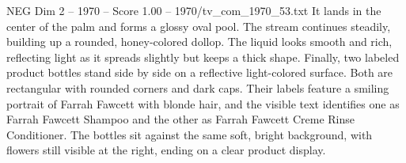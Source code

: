 \begin{textsample}{NEG Dim 2 – 1970 – Score 1.00 – 1970/tv\_com\_1970\_53.txt}
It lands in the center of the palm and forms a glossy oval pool.
The stream continues steadily, building up a rounded, honey-colored dollop.
The liquid looks smooth and rich, reflecting light as it spreads slightly but keeps a thick shape.
Finally, two labeled product bottles stand side by side on a reflective light-colored surface.
Both are rectangular with rounded corners and dark caps.
Their labels feature a smiling portrait of Farrah Fawcett with blonde hair, and the visible text identifies one as Farrah Fawcett Shampoo and the other as Farrah Fawcett Creme Rinse Conditioner.
The bottles sit against the same soft, bright background, with flowers still visible at the right, ending on a clear product display.

\end{textsample}
